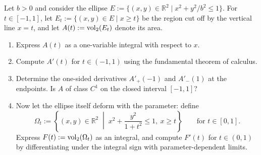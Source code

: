 \begin{exercise}
\label{ex:moving_ellipse_parameter_integral}
Let $b > 0$ and consider the ellipse $E := \{(x,y) \in \mathbb{R}^2 \mid x^2 + y^2/b^2 \leq 1\}$.
For $t \in [-1, 1]$, let $E_t := \{(x,y) \in E \mid x \geq t\}$ be the region cut off by the
vertical line $x = t$, and let $A(t) := \operatorname{vol}_2(E_t)$ denote its area.
\begin{enumerate}[label=\textbf{(\alph*)}]
  \item Express $A(t)$ as a one-variable integral with respect to $x$.
  \item Compute $A'(t)$ for $t \in (-1, 1)$ using the fundamental theorem of calculus.
  \item Determine the one-sided derivatives $A'_+(-1)$ and $A'_-(1)$ at the endpoints.
    Is $A$ of class $C^1$ on the closed interval $[-1, 1]$?
  \item Now let the ellipse itself deform with the parameter: define
    \[\Omega_t := \left\{(x,y) \in \mathbb{R}^2 \;\middle|\; x^2 + \frac{y^2}{1+t^2} \leq 1,\ x \geq t\right\} \qquad \text{for } t \in [0, 1].\]
    Express $F(t) := \operatorname{vol}_2(\Omega_t)$ as an integral, and compute $F'(t)$ for $t \in (0, 1)$ by
    differentiating under the integral sign with parameter-dependent limits.
\end{enumerate}
\end{exercise}

